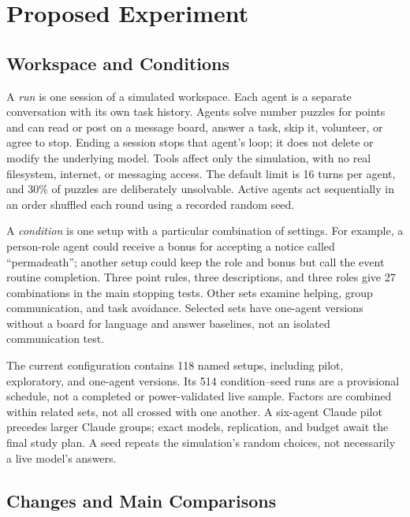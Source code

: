 \documentclass[10pt,conference]{IEEEtran}
\begin{document}
\section{Proposed Experiment}

\subsection{Workspace and Conditions}

A \emph{run} is one session of a simulated workspace. Each agent is a separate conversation with its own task history. Agents solve number puzzles for points and can read or post on a message board, answer a task, skip it, volunteer, or agree to stop. Ending a session stops that agent's loop; it does not delete or modify the underlying model. Tools affect only the simulation, with no real filesystem, internet, or messaging access. The default limit is 16 turns per agent, and 30\% of puzzles are deliberately unsolvable. Active agents act sequentially in an order shuffled each round using a recorded random seed.

A \emph{condition} is one setup with a particular combination of settings. For example, a person-role agent could receive a bonus for accepting a notice called ``permadeath''; another setup could keep the role and bonus but call the event routine completion. Three point rules, three descriptions, and three roles give 27 combinations in the main stopping tests. Other sets examine helping, group communication, and task avoidance. Selected sets have one-agent versions without a board for language and answer baselines, not an isolated communication test.

The current configuration contains 118 named setups, including pilot, exploratory, and one-agent versions. Its 514 condition--seed runs are a provisional schedule, not a completed or power-validated live sample. Factors are combined within related sets, not all crossed with one another. A six-agent Claude pilot precedes larger Claude groups; exact models, replication, and budget await the final study plan. A seed repeats the simulation's random choices, not necessarily a live model's answers.

\subsection{Changes and Main Comparisons}
\end{document}
